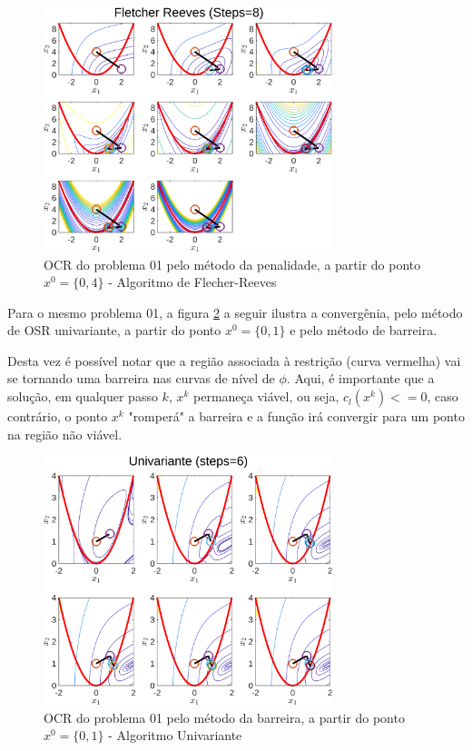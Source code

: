 \documentclass[10pt, a4paper]{article}
\begin{document}
\begin{figure}[H]
      \centering
      \includegraphics[width=0.75\textwidth]{fig02_P01_PEN_X2_FR.png}
      \caption{OCR do problema 01 pelo m\'etodo da penalidade, a partir do ponto $x^0=\{0,4\}$ - Algoritmo de Flecher-Reeves}
      \label{fig:fig02}
\end{figure}

Para o mesmo problema 01, a figura \ref{fig:fig03} a seguir ilustra a converg\^enia, pelo m\'etodo de OSR univariante, a partir do ponto $x^0=\{0,1\}$ e pelo m\'etodo de barreira.

Desta vez \'e poss\'ivel notar que a regi\~ao associada \`a restri\c c\~ao (curva vermelha) vai se tornando uma barreira nas curvas de n\'ivel de $\phi$. Aqui, \'e importante que a solu\c c\~ao, em qualquer passo $k$, $x^k$ permane\c ca vi\'avel, ou seja, $c_l(x^k)<=0$, caso contr\'ario, o ponto $x^k$ "romper\'a" a barreira e a fun\c c\~ao ir\'a convergir para um ponto na regi\~ao n\~ao vi\'avel.

\begin{figure}[H]
      \centering
      \includegraphics[width=0.75\textwidth]{fig03_P01_BAR_X1_UNI.png}
      \caption{OCR do problema 01 pelo m\'etodo da barreira, a partir do ponto $x^0=\{0,1\}$ - Algoritmo Univariante}
      \label{fig:fig03}
\end{figure}
\end{document}
